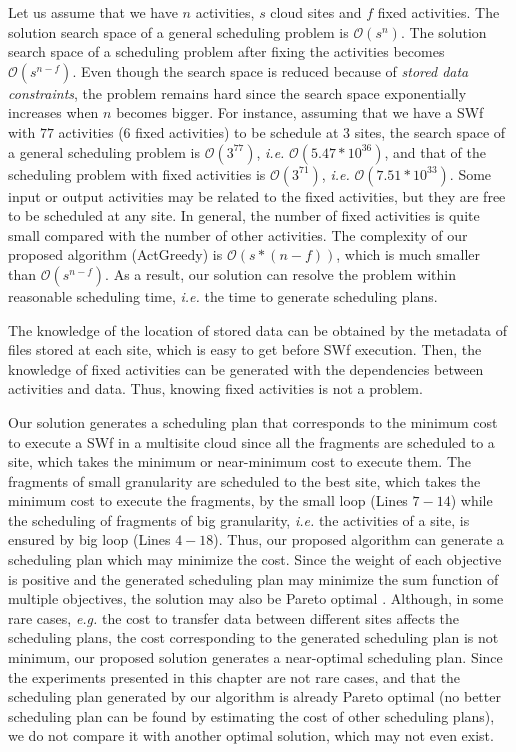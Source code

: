 Let us assume that we have $n$ activities, $s$ cloud sites and $f$ fixed activities. The solution search space of a general scheduling problem is $\mathcal{O}(s^n)$. The solution search space of a scheduling problem after fixing the activities becomes $\mathcal{O}(s ^ { n - f })$. Even though the search space is reduced because of \textit{stored data constraints}, the problem remains hard since the search space exponentially increases when $n$ becomes bigger. For instance, assuming that we have a SWf with $77$ activities ($6$ fixed activities) to be schedule at $3$ sites, the search space of a general scheduling problem is $\mathcal{O}(3^{77})$, \textit{i.e.} $\mathcal{O}(5.47 * 10^{36})$, and that of the scheduling problem with fixed activities is $\mathcal{O}(3^{71})$, \textit{i.e.} $\mathcal{O}(7.51 * 10^{33})$. Some input or output activities may be related to the fixed activities, but they are free to be scheduled at any site. In general, the number of fixed activities is quite small compared with the number of other activities. The complexity of our proposed algorithm (ActGreedy) is $\mathcal{O}(s * ( n - f ))$, which is much smaller than $\mathcal{O}(s ^ { n - f })$. As a result, our solution can resolve the problem within reasonable scheduling time, \textit{i.e.} the time to generate scheduling plans.

The knowledge of the location of stored data can be obtained by the metadata of files stored at each site, which is easy to get before SWf execution. Then, the knowledge of fixed activities can be generated with the dependencies between activities and data. Thus, knowing fixed activities is not a problem. 

Our solution generates a scheduling plan that corresponds to the minimum cost to execute a SWf in a multisite cloud since all the fragments are scheduled to a site, which takes the minimum  or near-minimum cost to execute them. The fragments of small granularity are scheduled to the best site, which takes the minimum cost to execute the fragments, by the small loop (Lines $7 - 14$) while the scheduling of fragments of big granularity, \textit{i.e.} the activities of a site, is ensured by big loop (Lines $4-18$). Thus, our proposed algorithm can generate a scheduling plan which may minimize the cost. Since the weight of each objective is positive and the generated scheduling plan may minimize the sum function of multiple objectives, the solution may also be Pareto optimal \cite{Zadeh1963} \cite{Marler2004}. Although, in some rare cases, \textit{e.g.} the cost to transfer data between different sites affects the scheduling plans, the cost corresponding to the generated scheduling plan is not minimum, our proposed solution generates a near-optimal scheduling plan. Since the experiments presented in this chapter are not rare cases, and that the scheduling plan generated by our algorithm is already Pareto optimal (no better scheduling plan can be found by estimating the cost of other scheduling plans), we do not compare it with another optimal solution, which may not even exist.

